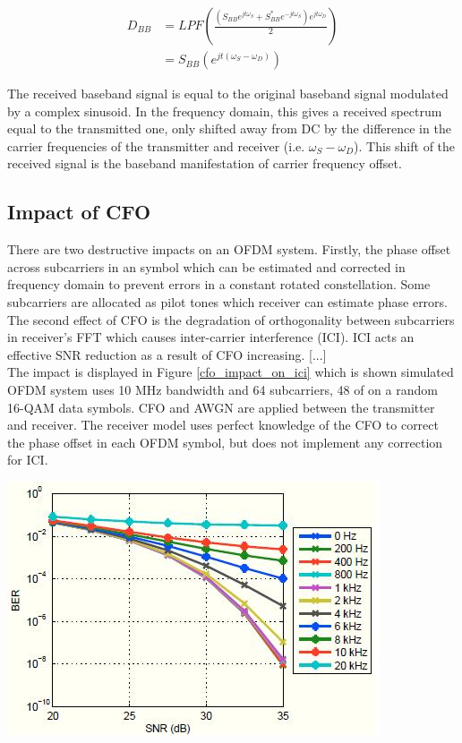 \begin{equation} \label{DBB_SBB}
\begin{split}
D_{BB} & = LPF(\frac{(S_{BB} e^{jt\omega_{S}} + S^{*}_{BB} e^{-jt\omega_{S}})e^{jt\omega_{D}}}{2})\\
&= S_{BB}(e^{jt(\omega_{S}- \omega_{D})})
\end{split}
\end{equation}

The received baseband signal is equal to the original baseband signal modulated by a complex sinusoid. In the frequency domain, this gives a received spectrum equal to the transmitted one, only shifted away from DC by the difference in the carrier frequencies of the transmitter and receiver (i.e. $\omega_{S}- \omega_{D}$). This shift of the received
signal is the baseband manifestation of carrier frequency offset.

\subsection{Impact of CFO}
\label{Impact_of_CFO}
There are two destructive impacts on an OFDM system. Firstly, the phase offset across subcarriers in an symbol which can be  estimated and corrected in frequency domain to prevent errors in a constant rotated constellation. Some subcarriers are allocated as pilot tones which receiver can estimate phase errors.\\
The second effect of CFO is the degradation of orthogonality between subcarriers in receiver's FFT which causes inter-carrier interference (ICI). ICI acts an effective SNR reduction as a result of CFO increasing. [...]\\
The impact is displayed in Figure \ref{cfo_impact_on_ici} which is shown simulated OFDM system uses 10 MHz bandwidth and 64 subcarriers, 48 of on a random 16-QAM data symbols. CFO and AWGN are applied between the transmitter and receiver. The receiver model uses perfect knowledge of the CFO to correct the phase offset in each OFDM symbol, but does not implement any correction for ICI.\\

\begin{center}
\includegraphics[width=\textwidth]{content/fig/cfo_on_ici.JPG}
\label{cfo_impact_on_ici}
\end{center}

